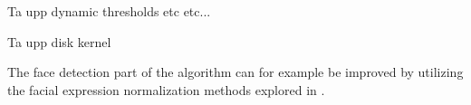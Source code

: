 
Ta upp dynamic thresholds etc etc...

Ta upp disk kernel

The face detection part of the algorithm can for example be improved by utilizing the facial expression normalization methods explored in  \cite{facialExpressions}.



